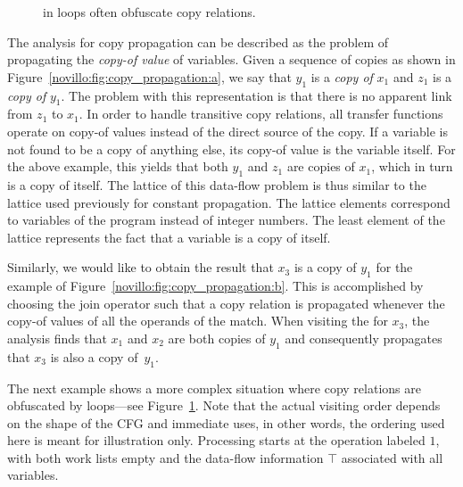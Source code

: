 \begin{figure}[htbp]
  \begin{center}
  \end{center}
  \vspace{-1em}
  \caption{\phifuns in loops often obfuscate copy relations.}
  \label{novillo:fig:copy_propagation_loop}
\end{figure}

The analysis for copy propagation can be described as the problem of propagating the \emph{copy-of value} of variables. 
Given a sequence of copies as shown in Figure~\ref{novillo:fig:copy_propagation:a}, we say that $y_1$ is a \textit{copy of} $x_1$ and $z_1$ is a \textit{copy of} $y_1$. 
The problem with this representation is that there is no apparent link from $z_1$ to $x_1$. 
In order to handle transitive copy relations, all transfer functions operate on copy-of values instead of the direct source of the copy. 
If a variable is not found to be a copy of anything else, its copy-of value is the variable itself. 
For the above example, this yields that both $y_1$ and $z_1$ are copies of $x_1$, which in turn is a copy of itself. 
The lattice of this data-flow problem is thus similar to the lattice used previously for constant propagation. 
The lattice elements correspond to variables of the program instead of integer numbers. 
The least element of the lattice represents the fact that a variable is a copy of itself.

Similarly, we would like to obtain the result that $x_3$ is a copy of $y_1$ for the example of Figure~\ref{novillo:fig:copy_propagation:b}. 
This is accomplished by choosing the join operator such that a copy relation is propagated whenever the copy-of values of all the operands of the \phifun match. 
When visiting the \phifun for $x_3$, the analysis finds that $x_1$ and $x_2$ are both copies of $y_1$ and consequently propagates that $x_3$ is also a copy of~$y_1$.

The next example shows a more complex situation where copy relations are obfuscated by loops---see Figure~\ref{novillo:fig:copy_propagation_loop}. 
Note that the actual visiting order depends on the shape of the CFG and immediate uses, in other words, the ordering used here is meant for illustration only. 
Processing starts at the operation labeled $1$, with both work lists empty and the data-flow information $\top$ associated with all variables.

